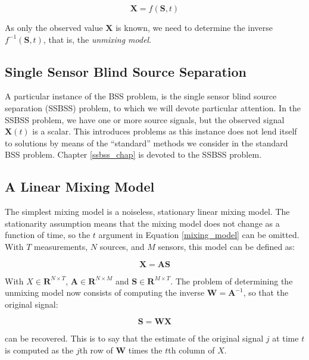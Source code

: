 \documentclass[11pt, oneside, a4paper]{report}
\begin{document}
\begin{equation}\label{mixing_model}
  \boldsymbol{X} = f(\boldsymbol{S},t)
\end{equation}

As only the observed value $\boldsymbol{X}$ is known, we need to determine the inverse $f^{-1}(\boldsymbol{S},t)$, that is, the \emph{unmixing model}.

\subsection*{Single Sensor Blind Source Separation}

A particular instance of the BSS problem, is the single sensor blind source separation (SSBSS) problem, to which we will devote particular attention. In the SSBSS problem, we have one or more source signals, but the observed signal $\boldsymbol{X}(t)$ is a scalar. This introduces problems as this instance does not lend itself to solutions by means of the ``standard'' methods we consider in the standard BSS problem. Chapter \ref{ssbss_chap} is devoted to the SSBSS problem.

\subsection{A Linear Mixing Model}

The simplest mixing model is a noiseless, stationary linear mixing model. The stationarity assumption means that the mixing model does not change as a function of time, so the $t$ argument in Equation \ref{mixing_model} can be omitted. With $T$ measurements, $N$ sources, and $M$ sensors, this model can be defined as:


\begin{equation}\label{linear_mixing_model}
 \boldsymbol{X} = \boldsymbol{A}\boldsymbol{S}
\end{equation}

With $\boldsymbol{}X \in \mathbf{R}^{N\times T}$, $\boldsymbol{A} \in \mathbf{R}^{N\times M}$
and $\boldsymbol{S} \in \mathbf{R}^{M\times T}$. The problem of determining the
unmixing model now consists of computing the inverse $\boldsymbol{W} = \boldsymbol{A}^{-1}$, so
that the original signal:

\begin{equation}\label{linear_unmixing_model}
\boldsymbol{S} = \boldsymbol{W}\boldsymbol{X}
\end{equation}

can be recovered. This is to say that the estimate of the original
signal $j$ at time $t$ is computed as the $j$th row of $\boldsymbol{W}$ times the
$t$th column of $X$.
\end{document}
